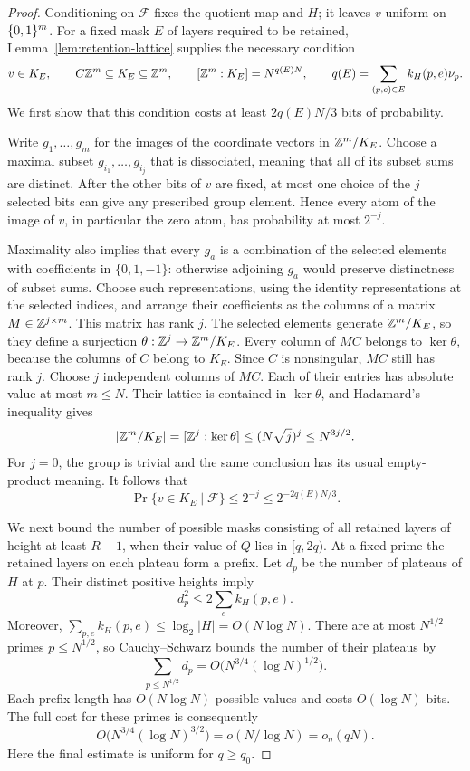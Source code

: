 \begin{proof}
Conditioning on \(\mathcal F\) fixes the quotient map and \(H\); it leaves \(v\)
uniform on \(\{0,1\}^m\).
For a fixed mask \(E\) of layers required to be retained,
Lemma~\ref{lem:retention-lattice} supplies the necessary condition
\[
 v\in K_E,\qquad
 C\mathbb Z^m\subseteq K_E\subseteq\mathbb Z^m,\qquad
 [\mathbb Z^m:K_E]=N^{q(E)N},\qquad
 q(E)=\sum_{(p,e)\in E}k_H(p,e)\nu_p.
\]
We first show that this condition costs at least
\(2q(E)N/3\) bits of probability.

Write \(g_1,\ldots,g_m\) for the images of the coordinate vectors in
\(\mathbb Z^m/K_E\). Choose a maximal subset \(g_{i_1},\ldots,g_{i_j}\) that
is dissociated, meaning that all of its subset sums are distinct.
After the other bits of \(v\) are fixed, at most one choice of the
\(j\) selected bits can give any prescribed group element. Hence every
atom of the image of \(v\), in particular the zero atom, has
probability at most \(2^{-j}\).

Maximality also implies that every \(g_a\) is a combination of the
selected elements with coefficients in \(\{0,1,-1\}\): otherwise
adjoining \(g_a\) would preserve distinctness of subset sums. Choose
such representations, using the identity representations at the
selected indices, and arrange their coefficients as the columns of a
matrix \(M\in\mathbb Z^{j\times m}\). This matrix has rank \(j\). The selected
elements generate \(\mathbb Z^m/K_E\), so they define a surjection
\(\theta:\mathbb Z^j\to\mathbb Z^m/K_E\). Every column of \(MC\) belongs to
\(\ker\theta\), because the columns of \(C\) belong to \(K_E\).
Since \(C\) is nonsingular, \(MC\) still has rank \(j\). Choose \(j\)
independent columns of \(MC\). Each of their entries has absolute
value at most \(m\le N\). Their lattice is contained in
\(\ker\theta\), and Hadamard's inequality gives
\[
 |\mathbb Z^m/K_E|=[\mathbb Z^j:\ker\theta]
 \le (N\sqrt j)^j\le N^{3j/2}.
\]
For \(j=0\), the group is trivial and the same conclusion has its
usual empty-product meaning. It follows that
\begin{equation}\label{eq:path-fixed-mask}
 \Pr\{v\in K_E\mid\mathcal F\}\le2^{-j}\le2^{-2q(E)N/3}.
\end{equation}

We next bound the number of possible masks consisting of all retained
layers of height at least \(R-1\), when their value of \(Q\) lies in
\([q,2q)\). At a fixed prime the retained layers on each plateau form
a prefix. Let \(d_p\) be the number of plateaus of \(H\) at \(p\).
Their distinct positive heights imply
\[
 d_p^2\le 2\sum_e k_H(p,e).
\]
Moreover,
\(\sum_{p,e}k_H(p,e)\le\log_2|H|=O(N\log N)\).
There are at most \(N^{1/2}\) primes \(p\le N^{1/2}\), so
Cauchy--Schwarz bounds the number of their plateaus by
\[
 \sum_{p\le N^{1/2}}d_p
   =O\bigl(N^{3/4}(\log N)^{1/2}\bigr).
\]
Each prefix length has \(O(N\log N)\) possible values and costs
\(O(\log N)\) bits. The full cost for these primes is consequently
\[
 O\bigl(N^{3/4}(\log N)^{3/2}\bigr)
     =o(N/\log N)=o_\eta(qN).
\]
Here the final estimate is uniform for \(q\ge q_0\).


\end{proof}
